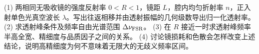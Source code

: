 (1) 两相同无吸收镜的强度反射率 \(0<R<1\)，镜距 \(L\)，腔内均匀折射率 \(n\)，正入射单色光真空波长 \(\lambda\)。写出往返相移并由透射振幅的几何级数导出归一化透射率。
(2) 求透射峰条件及频率自由光谱范围 \(\Delta\nu_{\rm FSR}\)。
(3) 在 \(R\) 接近一时求透射峰频率半高全宽、精细度与品质因子之间的关系。
(4) 讨论镜损耗和色散会怎样改变上述结论，说明高精细度为何不意味着无限大的无歧义频率区间。
